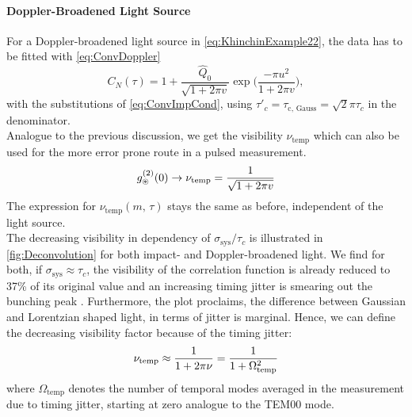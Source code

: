 \paragraph{Doppler-Broadened Light Source}
For a Doppler-broadened light source in \cref{eq:KhinchinExample22}, the data has to be fitted with \cref{eq:ConvDoppler}
\begin{equation}\label{eq:ConvDoppler}
	C_N(\tau)=1+\dfrac{\hat{Q}_0}{\sqrt{1+2\pi v}}\exp{\Big(\dfrac{-\pi u^{2}}{1+2\pi v}\Big)},
\end{equation}
with the substitutions of \cref{eq:ConvImpCond}, using $\tau'_c=\tau_\mathrm{c,\, Gauss}=\sqrt{2}\pi\tau_c$ in the denominator.\\
Analogue to the previous discussion, we get the visibility $\nu_\mathrm{temp}$ which can also be used for the more error prone route in a pulsed measurement.
\begin{equation}
g^{(2)}_\circledast(0)\rightarrow\nu_\mathrm{temp}=\dfrac{1}{\sqrt{1+2\pi v}}\label{eq:g2_dopplerdeconvzero}\\
\end{equation}
The expression for $\nu_\mathrm{temp}(m,\,\tau)$ stays the same as before, independent of the light source.\\
The decreasing visibility in dependency of $\sigma_\mathrm{sys}/\tau_c$ is illustrated in \cref{fig:Deconvolution} for both impact- and Doppler-broadened light.
We find for both, if $\sigma_\mathrm{sys}\approx \tau_c$, the visibility of the correlation function is already reduced to 37\% of its original value and an increasing timing jitter is smearing out the bunching peak \cite{hanbury_brown_test_1956}.
Furthermore, the plot proclaims, the difference between Gaussian and Lorentzian shaped light, in terms of jitter is marginal. Hence, we can define the decreasing visibility factor because of the timing jitter:
\begin{equation}
\nu_\mathrm{temp}\approx \dfrac{1}{1+2\pi\nu}=\dfrac{1}{1+\Omega^2_\mathrm{temp}}\label{eq:g2_vistemp}\\
\end{equation}
where $\Omega_\mathrm{temp}$ denotes the number of temporal modes averaged in the measurement due to timing jitter, starting at zero analogue to the TEM00 mode.

